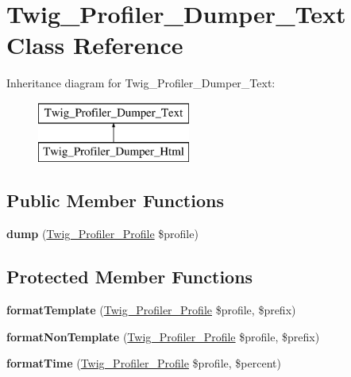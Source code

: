 \hypertarget{classTwig__Profiler__Dumper__Text}{}\section{Twig\+\_\+\+Profiler\+\_\+\+Dumper\+\_\+\+Text Class Reference}
\label{classTwig__Profiler__Dumper__Text}
Inheritance diagram for Twig\+\_\+\+Profiler\+\_\+\+Dumper\+\_\+\+Text\+:\begin{figure}[H]
\begin{center}
\leavevmode
\includegraphics[height=2.000000cm]{classTwig__Profiler__Dumper__Text}
\end{center}
\end{figure}
\subsection*{Public Member Functions}
\begin{DoxyCompactItemize}
\item 
{\bfseries dump} (\hyperlink{classTwig__Profiler__Profile}{Twig\+\_\+\+Profiler\+\_\+\+Profile} \$profile)\hypertarget{classTwig__Profiler__Dumper__Text_a718cda28c36e386994c8d96ff73826c1}{}\label{classTwig__Profiler__Dumper__Text_a718cda28c36e386994c8d96ff73826c1}

\end{DoxyCompactItemize}
\subsection*{Protected Member Functions}
\begin{DoxyCompactItemize}
\item 
{\bfseries format\+Template} (\hyperlink{classTwig__Profiler__Profile}{Twig\+\_\+\+Profiler\+\_\+\+Profile} \$profile, \$prefix)\hypertarget{classTwig__Profiler__Dumper__Text_aa4f3676c2551e49cd6608ac699a852b6}{}\label{classTwig__Profiler__Dumper__Text_aa4f3676c2551e49cd6608ac699a852b6}

\item 
{\bfseries format\+Non\+Template} (\hyperlink{classTwig__Profiler__Profile}{Twig\+\_\+\+Profiler\+\_\+\+Profile} \$profile, \$prefix)\hypertarget{classTwig__Profiler__Dumper__Text_ac5ac38afa6e2516a402c04e95a382430}{}\label{classTwig__Profiler__Dumper__Text_ac5ac38afa6e2516a402c04e95a382430}

\item 
{\bfseries format\+Time} (\hyperlink{classTwig__Profiler__Profile}{Twig\+\_\+\+Profiler\+\_\+\+Profile} \$profile, \$percent)\hypertarget{classTwig__Profiler__Dumper__Text_af5678fc55a8327010355ae095455d3b6}{}\label{classTwig__Profiler__Dumper__Text_af5678fc55a8327010355ae095455d3b6}

\end{DoxyCompactItemize}


